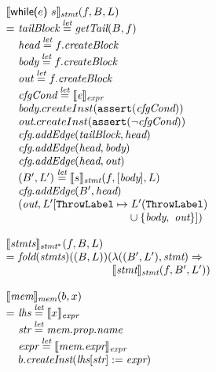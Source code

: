\[
\begin{array}{l@{}l@{~}l}
\lefteqn{\transfun{\ircfgwhile{e}{s}}_{\emph{stmt}}(f, B, L)}\\
& = & \emph{tailBlock} \letval \getTail(B, f)\\
& & \emph{head} \letval f.\emph{createBlock}\\
& & \emph{body} \letval f.\emph{createBlock}\\
& & \emph{out} \letval f.\emph{createBlock}\\
& & \emph{cfgCond} \letval \transfun{\emph{e}}_{\emph{expr}}\\
& & \emph{body}.createInst(\TT{assert}(\emph{cfgCond}))\\
& & \emph{out}.createInst(\TT{assert}(\neg \emph{cfgCond}))\\
& & \emph{cfg}.\emph{addEdge}(\emph{tailBlock}, \emph{head})\\
& & \emph{cfg}.\emph{addEdge}(\emph{head}, \emph{body})\\
& & \emph{cfg}.\emph{addEdge}(\emph{head}, \emph{out})\\
& & (B', L') \letval \transfun{s}_{\emph{stmt}}(f, [\emph{body}], L)\\
& & \emph{cfg}.\emph{addEdge}(B', \emph{head})\\
& & (\emph{out}, L'[\ThrowLabel \mapsto L'(\ThrowLabel)\\
& & \phantom{(\emph{out}, L'[\ThrowLabel \mapsto } \cup \{ \emph{body},\ \emph{out} \}]) \\
& & \\

\lefteqn{\transfun{\emph{stmts}}_{\emph{stmt}^{*}}(f, B, L)}\\
& = & \fold(\emph{stmts})((B, L))(\lambda((B', L'), \emph{stmt}) \Rightarrow\\
&& \phantom{\fold(\emph{stmts})((B, L))(} \transfun{\emph{stmt}}_{\emph{stmt}}(f, B', L'))\\
& & \\

\lefteqn{\transfun{\emph{mem}}_{\emph{mem}}(b, x)}\\
& = & \emph{lhs} \letval \transfun{x}_{\emph{expr}}\\
& & \emph{str} \letval \emph{mem}.\emph{prop}.\emph{name}\\
& & \emph{expr} \letval \transfun{\emph{mem}.\emph{expr}}_{\emph{expr}}\\
& & b.\emph{createInst}(\emph{lhs}[\emph{str}] := \emph{expr})\\
& & \\


\end{array}\]

